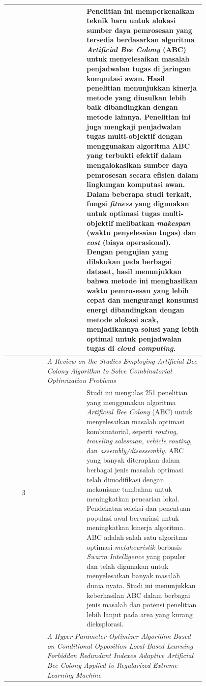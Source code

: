 \begin{longtable}{|c|m{0.2\linewidth}|m{0.6\linewidth}|}
                   & \multicolumn{1}{c|}{\parencite{Babadi2022}} & Penelitian ini memperkenalkan teknik baru untuk alokasi sumber daya pemrosesan yang tersedia berdasarkan algoritma \textit{Artificial Bee Colony} (ABC) untuk menyelesaikan masalah penjadwalan tugas di jaringan komputasi awan. Hasil penelitian menunjukkan kinerja metode yang diusulkan lebih baik dibandingkan dengan metode lainnya. Penelitian ini juga mengkaji penjadwalan tugas multi-objektif dengan menggunakan algoritma ABC yang terbukti efektif dalam mengalokasikan sumber daya pemrosesan secara efisien dalam lingkungan komputasi awan. Dalam beberapa studi terkait, fungsi \textit{fitness} yang digunakan untuk optimasi tugas multi-objektif melibatkan \textit{makespan} (waktu penyelesaian tugas) dan \textit{cost} (biaya operasional). Dengan pengujian yang dilakukan pada berbagai dataset, hasil menunjukkan bahwa metode ini menghasilkan waktu pemrosesan yang lebih cepat dan mengurangi konsumsi energi dibandingkan dengan metode alokasi acak, menjadikannya solusi yang lebih optimal untuk penjadwalan tugas di \textit{cloud computing}. \\ \hline
  \multirow{2}{*}{3} & \multicolumn{2}{|p{\dimexpr0.9\linewidth}|}{\textit{A Review on the Studies Employing Artificial Bee Colony Algorithm to Solve Combinatorial Optimization Problems}} \\ \cline{2-3}
                   & \multicolumn{1}{c|}{\parencite{Kaya2022}} & Studi ini mengulas 251 penelitian yang menggunakan algoritma \textit{Artificial Bee Colony} (ABC) untuk menyelesaikan masalah optimasi kombinatorial, seperti \textit{routing}, \textit{traveling salesman}, \textit{vehicle routing}, dan \textit{assembly/disassembly}. ABC yang banyak diterapkan dalam berbagai jenis masalah optimasi telah dimodifikasi dengan mekanisme tambahan untuk meningkatkan pencarian lokal. Pendekatan seleksi dan penentuan populasi awal bervariasi untuk meningkatkan kinerja algoritma. ABC adalah salah satu algoritma optimasi \textit{metaheuristik} berbasis \textit{Swarm Intelligence} yang populer dan telah digunakan untuk menyelesaikan banyak masalah dunia nyata. Studi ini menunjukkan keberhasilan ABC dalam berbagai jenis masalah dan potensi penelitian lebih lanjut pada area yang kurang dieksplorasi. \\ \hline
  \pagebreak
  \multirow{2}{*}{4} & \multicolumn{2}{|p{\dimexpr0.9\linewidth}|}{\textit{A Hyper-Parameter Optimizer Algorithm Based on Conditional Opposition Local-Based Learning Forbidden Redundant Indexes Adaptive Artificial Bee Colony Applied to Regularized Extreme Learning Machine}} \\ \cline{2-3}

\end{longtable}
